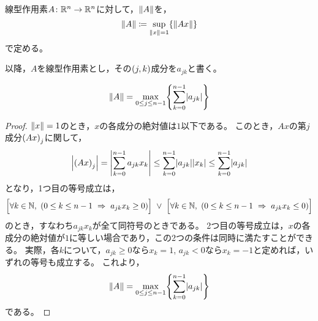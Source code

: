 \documentclass[b5paper,oneside,openany]{ltjsbook} %
\begin{document}
\begin{defi}[作用素ノルム]
    線型作用素$A\colon \mathbb{R}^n\to\mathbb{R}^n$に対して，$\norm{A}$を，
    \begin{equation}
        \norm{A}\coloneqq \sup_{\norm{x}=1}\bra{\norm{Ax}}
    \end{equation}
    で定める。
\end{defi}

以降，$A$を線型作用素とし，その$\pare{j,k}$成分を$a_{jk}$と書く。

\begin{prop}
    \begin{equation}
        \norm{A} = \max_{0\leq j\leq n-1} \bra{\sum_{k=0}^{n-1} \abs{a_{jk}}}
    \end{equation}
    \begin{proof}
        $\norm{x}=1$のとき，$x$の各成分の絶対値は$1$以下である。
        このとき，$Ax$の第$j$成分$\pare{Ax}_j$に関して，
        \begin{equation}
            \abs{\pare{Ax}_j}=\abs{\sum_{k=0}^{n-1}a_{jk} x_k}
            \leq \sum_{k=0}^{n-1}\abs{a_{jk}}\abs{x_k}\leq \sum_{k=0}^{n-1}\abs{a_{jk}}
        \end{equation}
        となり，1つ目の等号成立は，
        \begin{equation}
            \bsqu{\forall k\in\N,\ \pare{0\leq k\leq n-1 \ \Rightarrow\ a_{jk}x_k\geq 0}}
            \ \lor\ 
            \bsqu{\forall k\in\N,\ \pare{0\leq k\leq n-1 \ \Rightarrow\ a_{jk}x_k\leq 0}}
        \end{equation}
        のとき，すなわち$a_{jk}x_k$が全て同符号のときである。
        2つ目の等号成立は，$x$の各成分の絶対値が$1$に等しい場合であり，この2つの条件は同時に満たすことができる。
        実際，各$k$について，$a_{jk}\geq 0$なら$x_k=1$, $a_{jk}<0$なら$x_k=-1$と定めれば，いずれの等号も成立する。
        これより，
        \begin{equation}
            \norm{A} = \max_{0\leq j\leq n-1} \bra{\sum_{k=0}^{n-1} \abs{a_{jk}}}
        \end{equation}
        である。
    \end{proof}
\end{prop}
\end{document}
